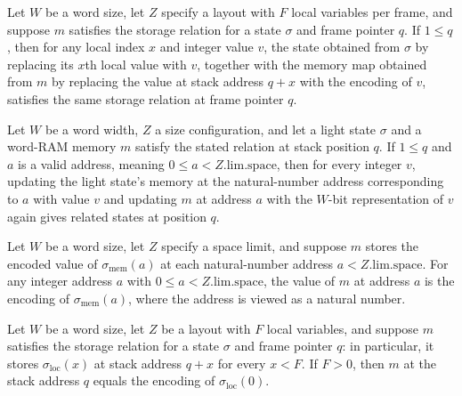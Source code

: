\begin{theorem}
\label{Light.Compiler.Rel.setLoc}
\leanok
{}
Let $W$ be a word size, let $Z$ specify a layout with $F$ local variables per frame, and
suppose $m$ satisfies the storage relation for a state $\sigma$ and frame pointer $q$.
If $1\le q$, then for any local index $x$ and integer value $v$, the state obtained from
$\sigma$ by replacing its $x$th local value with $v$, together with the memory map
obtained from $m$ by replacing the value at stack address $q+x$ with the encoding of
$v$, satisfies the same storage relation at frame pointer $q$.
\end{theorem}

\begin{theorem}
\label{Light.Compiler.Rel.setMem}
\leanok
{}
Let $W$ be a word width, $Z$ a size configuration, and let a light state $\sigma$
and a word-RAM memory $m$ satisfy the stated relation at stack position $q$. If $1\le q$
and $a$ is a valid address, meaning $0\le a<Z.\mathrm{lim}.\mathrm{space}$, then for
every integer $v$, updating the light state's memory at the natural-number address
corresponding to $a$ with value $v$ and updating $m$ at address $a$ with the $W$-bit
representation of $v$ again gives related states at position $q$.
\end{theorem}

\begin{theorem}
\label{Light.Compiler.Rel.read}
\leanok
{}
Let $W$ be a word size, let $Z$ specify a space limit, and suppose $m$ stores the
encoded value of $\sigma_{\mathrm{mem}}(a)$ at each natural-number address
$a<Z.\mathrm{lim}.\mathrm{space}$. For any integer address $a$ with $0\le
a<Z.\mathrm{lim}.\mathrm{space}$, the value of $m$ at address $a$ is the encoding of
$\sigma_{\mathrm{mem}}(a)$, where the address is viewed as a natural number.
\end{theorem}

\begin{theorem}
\label{Light.Compiler.Rel.loc_zero}
\leanok
{}
Let $W$ be a word size, let $Z$ be a layout with $F$ local variables, and suppose $m$
satisfies the storage relation for a state $\sigma$ and frame pointer $q$: in
particular, it stores $\sigma_{\mathrm{loc}}(x)$ at stack address $q+x$ for every $x<F$.
If $F>0$, then $m$ at the stack address $q$ equals the encoding of
$\sigma_{\mathrm{loc}}(0)$.
\end{theorem}

